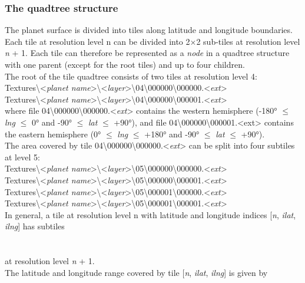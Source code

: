\documentclass[Orbiter Developer Manual.tex]{subfiles}
\begin{document}
\subsubsection{The quadtree structure}
The planet surface is divided into tiles along latitude and longitude boundaries. Each tile at resolution level n can be divided into 2×2 sub-tiles at resolution level \textit{n} + 1. Each tile can therefore be represented as a \textit{node} in a quadtree structure with one parent (except for the root tiles) and up to four children.\\
The root of the tile quadtree consists of two tiles at resolution level 4:\\
\indent Textures\textbackslash <\textit{planet name}>\textbackslash <\textit{layer}>\textbackslash 04\textbackslash 000000\textbackslash 000000.<\textit{ext}>\\
\indent Textures\textbackslash <\textit{planet name}>\textbackslash <\textit{layer}>\textbackslash 04\textbackslash 000000\textbackslash 000001.<\textit{ext}>\\
where file 04\textbackslash 000000\textbackslash 000000.<\textit{ext}> contains the western hemisphere (-180° $\leq$ \textit{lng} $\leq$ 0° and -90° $\leq$ \textit{lat} $\leq$ +90°), and file 04\textbackslash 000000\textbackslash 000001.<ext> contains the eastern hemisphere (0° $\leq$ \textit{lng} $\leq$ +180° and -90° $\leq$ \textit{lat} $\leq$ +90°).\\
The area covered by tile 04\textbackslash 000000\textbackslash 000000.<\textit{ext}> can be split into four subtiles at level 5:\\
\indent Textures\textbackslash <\textit{planet name}>\textbackslash <\textit{layer}>\textbackslash 05\textbackslash 000000\textbackslash 000000.<\textit{ext}>\\
\indent Textures\textbackslash <\textit{planet name}>\textbackslash <\textit{layer}>\textbackslash 05\textbackslash 000000\textbackslash 000001.<\textit{ext}>\\
\indent Textures\textbackslash <\textit{planet name}>\textbackslash <\textit{layer}>\textbackslash 05\textbackslash 000001\textbackslash 000000.<\textit{ext}>\\
\indent Textures\textbackslash <\textit{planet name}>\textbackslash <\textit{layer}>\textbackslash 05\textbackslash 000001\textbackslash 000001.<\textit{ext}>\\
In general, a tile at resolution level n with latitude and longitude indices [\textit{n}, \textit{ilat}, \textit{ilng}] has subtiles\\
\\
\\
at resolution level \textit{n} + 1.\\
The latitude and longitude range covered by tile [\textit{n}, \textit{ilat}, \textit{ilng}] is given by
\end{document}
